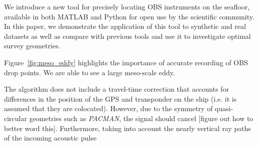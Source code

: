 We introduce a new tool for precisely locating OBS instruments on the seafloor, available in both MATLAB and Python for open use by the scientific community. In this paper, we demonstrate the application of this tool to synthetic and real datasets as well as compare with previous tools and use it to investigate optimal survey geometries.

Figure~\ref{fig:meso_eddy} highlights the importance of accurate recording of OBS drop points. We are able to see a large meso-scale eddy.

The algorithm does not include a travel-time correction that accounts for differences in the position of the GPS and transponder on the ship (i.e. it is assumed that they are colocated). However, due to the symmetry of quasi-circular geometries such as \textit{PACMAN}, the signal should cancel [figure out how to better word this]. Furthermore, taking into account the nearly vertical ray paths of the incoming acoustic pulse 